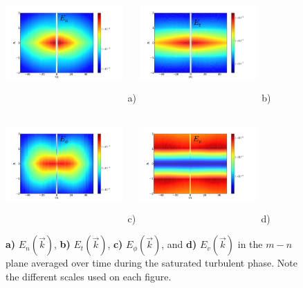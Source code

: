 \documentclass[showpacs,preprintnumbers,amsmath,amssymb,superscriptaddress]{revtex4}
\begin{document}
\begin{figure}[!htbp]
\includegraphics[width=0.40\textwidth,height=45mm]{En}~a)
\hfil
\includegraphics[width=0.40\textwidth,height=45mm]{Et}~b)
\hfil
\includegraphics[width=0.40\textwidth,height=45mm]{Ep}~c)
\hfil
\includegraphics[width=0.40\textwidth,height=45mm]{Ev}~d)
\hfil
\caption{\textbf{a)} $E_n(\vec{k})$, \textbf{b)} $E_t(\vec{k})$, \textbf{c)} $E_\phi(\vec{k})$, and \textbf{d)} $E_v(\vec{k})$ in the $m-n$ plane averaged over time during the saturated turbulent phase.
Note the different scales used on each figure.}
\label{energy_figures}
\end{figure}
\end{document}
